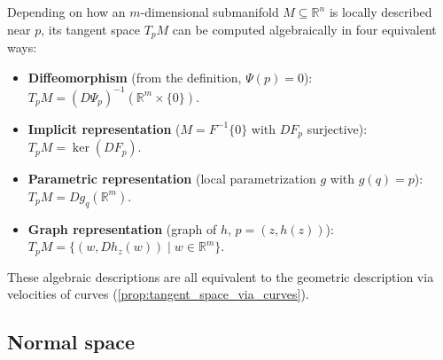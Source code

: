 \begin{remark}
\label{rem:four_representations_tangent_space}
Depending on how an $m$-dimensional submanifold $M \subseteq \mathbb{R}^n$ is locally described near $p$, its tangent space $T_pM$ can be computed algebraically in four equivalent ways:
\begin{itemize}
  \item \textbf{Diffeomorphism} (from the definition, $\Psi(p)=0$): $T_pM = (D\Psi_p)^{-1}(\mathbb{R}^m \times \{0\})$.
  \item \textbf{Implicit representation} ($M = F^{-1}\{0\}$ with $DF_p$ surjective): $T_pM = \ker(DF_p)$.
  \item \textbf{Parametric representation} (local parametrization $g$ with $g(q)=p$): $T_pM = Dg_q(\mathbb{R}^m)$.
  \item \textbf{Graph representation} (graph of $h$, $p=(z, h(z))$): $T_pM = \{(w, Dh_z(w)) \mid w \in \mathbb{R}^m\}$.
\end{itemize}
These algebraic descriptions are all equivalent to the geometric description via velocities of curves (\cref{prop:tangent_space_via_curves}).
\end{remark}

\subsection{Normal space}

